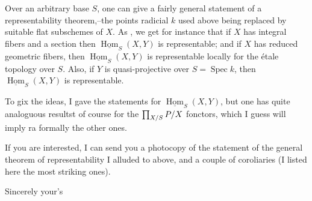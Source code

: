 Over an arbitrary base $S$, one can give a fairly general statement of a representability theorem,--the points radicial  $k$ used above being replaced by suitable flat subschemes of $X$. As , we get for instance that if $X$ has integral  fibers and a section  then $\underline{\operatorname{Hom}}_S(X,Y)$ is representable; and if $X$ has reduced geometric fibers, then $\underline{\operatorname{Hom}}_S(X,Y)$ is representable locally for the étale topology over $S$. Also, if $Y$ is quasi-projective over $S=\operatorname{Spec}k$, then $\underline{\operatorname{Hom}}_S(X,Y)$ is representable.

To gix the ideas, I gave the statements for $\underline{\operatorname{Hom}}_S(X,Y)$, but one has quite analoguous resultst of course for the $\prod_{X/S}P/X$ fonctors, which I guess will imply ra formally the other ones.

If you are interested, I can send you a photocopy of the statement of the general theorem of representability I alluded to\deleted{\unsure{,}} above, and a couple of coroliaries (I  listed here the most striking ones).

Sincerely your's\\

